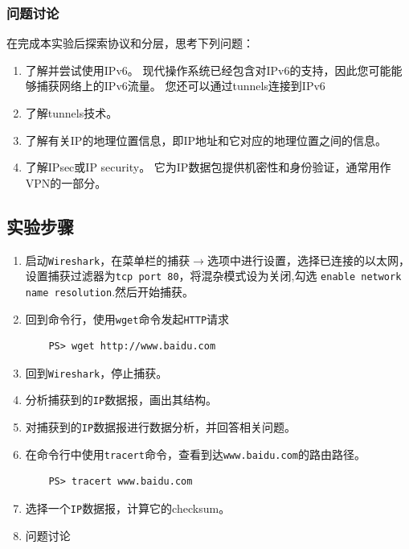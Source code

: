 \documentclass{article}
\begin{document}
\subsubsection{问题讨论}

在完成本实验后探索协议和分层，思考下列问题：

\begin{enumerate}[noitemsep]
  \item 了解并尝试使用IPv6。 现代操作系统已经包含对IPv6的支持，因此您可能能够捕获网络上的IPv6流量。 您还可以通过tunnels连接到IPv6
  \item 了解tunnels技术。
  \item 了解有关IP的地理位置信息，即IP地址和它对应的地理位置之间的信息。
  \item 了解IPsec或IP security。 它为IP数据包提供机密性和身份验证，通常用作VPN的一部分。
\end{enumerate}


\subsection{实验步骤}

\begin{enumerate}[noitemsep, label={{\arabic*})}]
  \item 启动\texttt{Wireshark}，在菜单栏的捕获\(\to \)选项中进行设置，选择已连接的以太网，设置捕获过滤器为\texttt{tcp port 80}，将混杂模式设为关闭,勾选
        \texttt{enable network name resolution}.然后开始捕获。
  \item 回到命令行，使用\texttt{wget}命令发起\texttt{HTTP}请求
        \begin{lstlisting}
    PS> wget http://www.baidu.com
  \end{lstlisting}
  \item 回到\texttt{Wireshark}，停止捕获。
  \item 分析捕获到的\texttt{IP}数据报，画出其结构。
  \item 对捕获到的\texttt{IP}数据报进行数据分析，并回答相关问题。
  \item 在命令行中使用\texttt{tracert}命令，查看到达\texttt{www.baidu.com}的路由路径。

        \begin{lstlisting}
    PS> tracert www.baidu.com
  \end{lstlisting}

  \item 选择一个\texttt{IP}数据报，计算它的checksum。

  \item 问题讨论
\end{enumerate}
\end{document}
